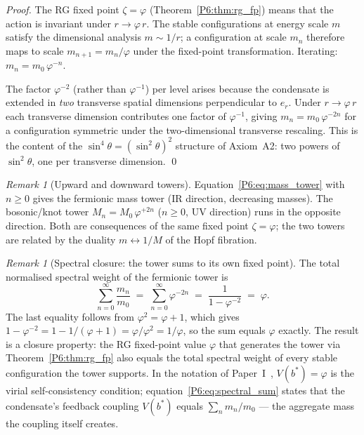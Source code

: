 \documentclass[11pt,a4paper]{article}
\theoremstyle{definition}
\theoremstyle{remark}
\newtheorem{remark}[theorem]{Remark}
\newcommand{\vp}{\varphi}
\begin{document}
\begin{proof}
The RG fixed point $\zeta = \vp$ (Theorem~\ref{P6:thm:rg_fp}) means that
the action is invariant under $r \to \vp\,r$.  The stable configurations
at energy scale $m$ satisfy the dimensional analysis $m \sim 1/r$; a
configuration at scale $m_n$ therefore maps to scale $m_{n+1} = m_n/\vp$
under the fixed-point transformation.  Iterating:
$m_n = m_0\,\vp^{-n}$.

The factor $\vp^{-2}$ (rather than $\vp^{-1}$) per level arises because
the condensate is extended in \emph{two} transverse spatial dimensions
perpendicular to $\hat{e}_r$.  Under $r \to \vp\,r$ each transverse
dimension contributes one factor of $\vp^{-1}$, giving $m_n = m_0\,\vp^{-2n}$
for a configuration symmetric under the two-dimensional transverse
rescaling.  This is the content of the $\sin^4\!\theta = (\sin^2\!\theta)^2$
structure of Axiom~A2: two powers of $\sin^2\!\theta$, one per transverse
dimension.
\qed
\end{proof}

\begin{remark}[Upward and downward towers]
Equation~\eqref{P6:eq:mass_tower} with $n \geq 0$ gives the fermionic
mass tower (IR direction, decreasing masses).  The bosonic/knot tower
$M_n = M_0\,\vp^{+2n}$ ($n \geq 0$, UV direction) runs in the opposite
direction.  Both are consequences of the same fixed point $\zeta = \vp$;
the two towers are related by the duality $m \leftrightarrow 1/M$ of the
Hopf fibration.
\end{remark}

\begin{remark}[Spectral closure: the tower sums to its own fixed point]
\label{P6:rem:spectral_closure}
The total normalised spectral weight of the fermionic tower is
\begin{equation}
  \sum_{n=0}^{\infty} \frac{m_n}{m_0}
  \;=\; \sum_{n=0}^{\infty} \vp^{-2n}
  \;=\; \frac{1}{1-\vp^{-2}} \;=\; \vp.
  \label{P6:eq:spectral_sum}
\end{equation}
The last equality follows from $\vp^2 = \vp+1$, which gives
$1 - \vp^{-2} = 1 - 1/(\vp+1) = \vp/\vp^2 = 1/\vp$,
so the sum equals $\vp$ exactly.
The result is a closure property: the RG fixed-point value $\vp$
that generates the tower via Theorem~\ref{P6:thm:rg_fp} also equals
the total spectral weight of every stable configuration the tower supports.
In the notation of Paper~I~\cite{Paper1}, $V(b^*) = \vp$ is the virial
self-consistency condition; equation~\eqref{P6:eq:spectral_sum} states that
the condensate's feedback coupling $V(b^*)$ equals
$\sum_n m_n/m_0$ --- the aggregate mass the coupling itself creates.
\end{remark}
\end{document}
